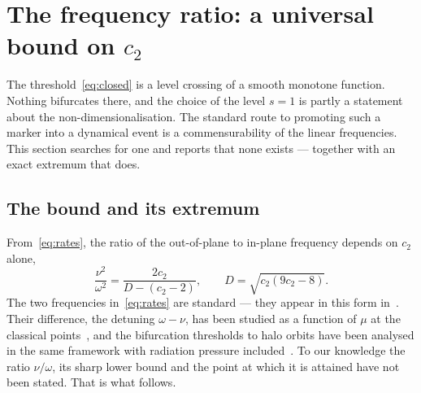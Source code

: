 \documentclass[pdflatex,sn-mathphys-num]{sn-jnl}
\begin{document}
\section{The frequency ratio: a universal bound on \texorpdfstring{$c_2$}{c2}}\label{sec:freq}

The threshold~\eqref{eq:closed} is a level crossing of a smooth monotone
function. Nothing bifurcates there, and the choice of the level $s=1$ is partly
a statement about the non-dimensionalisation. The standard route to promoting
such a marker into a dynamical event is a commensurability of the linear
frequencies. This section searches for one and reports that none exists ---
together with an exact extremum that does.

\subsection{The bound and its extremum}

From~\eqref{eq:rates}, the ratio of the out-of-plane to in-plane frequency
depends on $c_2$ alone,
\begin{equation}
  \frac{\nu^{2}}{\omega^{2}} = \frac{2c_2}{D-(c_2-2)},
  \qquad D=\sqrt{c_2(9c_2-8)} .
  \label{eq:R}
\end{equation}
The two frequencies in~\eqref{eq:rates} are standard --- they appear in this
form in~\cite{richardson1980,jorba1999physd,gomez2001,ceccaroni2016physd}. Their
difference, the detuning $\omega-\nu$, has been studied as a function of $\mu$
at the classical points~\cite{pucacco2019,ceccaroni2016physd}, and the
bifurcation thresholds to halo orbits have been analysed in the same framework
with radiation pressure included~\cite{bucciarelli2016}. To our knowledge the
ratio $\nu/\omega$, its sharp lower bound and the point at which it is attained
have not been stated. That is what follows.
\end{document}

